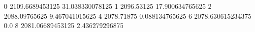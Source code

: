 0 2109.6689453125 31.038330078125
1 2096.53125 17.900634765625
2 2088.09765625 9.467041015625
4 2078.71875 0.088134765625
6 2078.630615234375 0.0
8 2081.06689453125 2.436279296875
